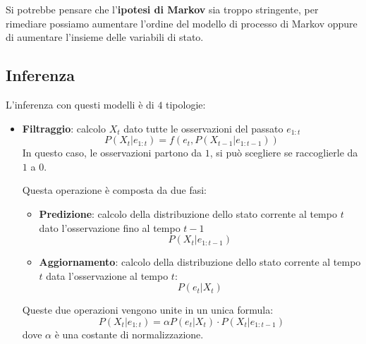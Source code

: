 Si potrebbe pensare che l'\textbf{ipotesi di Markov} sia troppo stringente, per
rimediare possiamo aumentare l'ordine del modello di processo di Markov oppure di
aumentare l'insieme delle variabili di stato.
\subsection{Inferenza}
L'inferenza con questi modelli è di $4$ tipologie:
\begin{itemize}
    \item \textbf{Filtraggio}: calcolo $X_t$ dato tutte le osservazioni del
          passato $e_{1:t}$
          \begin{equation}
              P(X_t | e_{1:t})= f(e_t, P(X_{t-1}|e_{1:t-1}))
          \end{equation}
          In questo caso, le osservazioni partono da $1$, si può scegliere se
          raccoglierle da $1$ a $0$.

          Questa operazione è composta da due fasi:
          \begin{itemize}
              \item \textbf{Predizione}: calcolo della distribuzione dello stato
                    corrente al tempo $t$ dato l'osservazione fino al tempo $t-1$
                    \begin{equation}
                        P(X_t | e_{1:t-1})
                    \end{equation}
              \item \textbf{Aggiornamento}: calcolo della distribuzione dello stato
                    corrente al tempo $t$ data l'osservazione al tempo $t$:
                    \begin{equation}
                        P(e_t | X_{t})
                    \end{equation}
          \end{itemize}
          Queste due operazioni vengono unite in un unica formula:
          \begin{equation}
              P(X_{t} | e_{1:t}) = \alpha P(e_{t}|X_{t})\cdot P(X_{t}|e_{1:t-1})
          \end{equation}
          dove $\alpha$ è una costante di normalizzazione.


\end{itemize}
